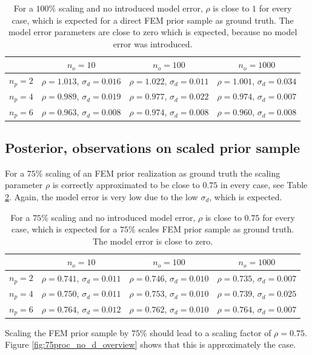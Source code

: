 \documentclass[%
  a4paper,oneside,%
  11pt,%
  smallchapters,
  style=printdev,
  extramargin,
  green,%
  rgb, <cmyk>
  ]{tubsbook}
\begin{document}
\begin{table}[]
\centering
\caption{For a $100\%$ scaling and no introduced model error, $\rho$ is close to $1$ for every case, which is expected for a direct FEM prior sample as ground truth. The model error parameters are close to zero which is expected, because no model error was introduced.}
\label{tab:rho100p_nod}
\begin{tabular}{@{}cccc@{}}
\toprule
  & $n_o = 10$ & $n_o = 100$ & $n_o = 1000$ \\ \midrule
$n_p = 2$           & $\rho=1.013$, $\sigma_d=0.016$      & $\rho=1.022$, $\sigma_d=0.011$      & $\rho=1.001$, $\sigma_d=0.034$         \\
$n_p = 4$           & $\rho=0.989$, $\sigma_d=0.019$      & $\rho=0.977$, $\sigma_d=0.022$      & $\rho=0.974$, $\sigma_d=0.007$        \\
$n_p = 6$           & $\rho=0.963$, $\sigma_d=0.008$     & $\rho=0.974$, $\sigma_d=0.008$      & $\rho=0.960$, $\sigma_d=0.008$        \\ \bottomrule
\end{tabular}
\end{table}
%

\subsection{Posterior, observations on scaled prior sample}
For a $75\%$ scaling of an FEM prior realization as ground truth the scaling parameter $\rho$ is correctly approximated to be close to $0.75$ in every case, see Table \ref{tab:rho75p_nod}. Again, the model error is very low due to the low $\sigma_d$, which is expected.
\begin{table}[]
\centering
\caption{For a $75\%$ scaling and no introduced model error, $\rho$ is close to $0.75$ for every case, which is expected for a $75 \%$ scales FEM prior sample as ground truth. The model error is close to zero.}
\label{tab:rho75p_nod}
\begin{tabular}{@{}cccc@{}}
\toprule
  & $n_o = 10$ & $n_o = 100$ & $n_o = 1000$ \\ \midrule
$n_p = 2$           & $\rho=0.741$, $\sigma_d=0.011$      & $\rho=0.746$, $\sigma_d=0.010$      & $\rho=0.735$, $\sigma_d=0.007$         \\
$n_p = 4$           & $\rho=0.750$, $\sigma_d=0.011$      & $\rho=0.753$, $\sigma_d=0.010$      & $\rho=0.739$, $\sigma_d=0.025$        \\
$n_p = 6$           & $\rho=0.764$, $\sigma_d=0.012$     & $\rho=0.762$, $\sigma_d=0.010$      & $\rho=0.764$, $\sigma_d=0.007$        \\ \bottomrule
\end{tabular}
\end{table}
%
Scaling the FEM prior sample by $75\%$ should lead to a scaling factor of $\rho = 0.75$. Figure \ref{fig:75proc_no_d_overview} shows that this is approximately the case.
\end{document}
